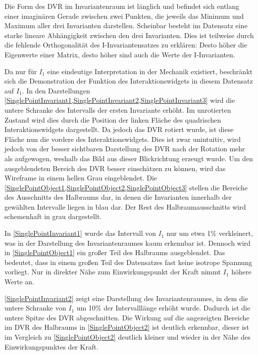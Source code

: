 \documentclass[a4paper,fontsize=12pt,toc=bib,halfparskip,ngerman]{scrartcl}
\begin{document}
Die Form des DVR im Invariantenraum ist l\"anglich und befindet sich entlang einer imagin\"aren Gerade zwischen zwei Punkten, die jeweils das Minimum und Maximum aller drei Invarianten darstellen. Scheinbar besteht im Datensatz eine starke lineare Abh\"angigkeit zwischen den drei Invarianten. Dies ist teilweise durch die fehlende Orthogonalit\"at des I-Invariantensatzes zu erkl\"aren: Desto h\"oher die Eigenwerte einer Matrix, desto h\"oher sind auch die Werte der I-Invarianten.  

Da nur f\"ur $I_1$ eine eindeutige Interpretation in der Mechanik existiert, beschr\"ankt sich die Demonstration der Funktion des Interaktionswidgets in diesem Datensatz auf $I_1$. In den Darstellungen \cref{SinglePointInvariant1,SinglePointInvariant2,SinglePointInvariant3} wird die untere Schranke des Intervalls der ersten Invariante erh\"oht. Im unrotierten Zustand wird dies durch die Position der linken Fl\"ache des quadrischen Interaktionswidgets dargestellt. Da jedoch das DVR rotiert wurde, ist diese Fl\"ache nun die vordere des Interaktionswidgets. Dies ist zwar unintuitiv, wird jedoch von der besser sichtbaren Darstellung des DVR nach der Rotation mehr als aufgewogen, weshalb das Bild aus dieser Blickrichtung erzeugt wurde. Um den ausgeblendeten Bereich des DVR besser einsch\"atzen zu k\"onnen, wird das Wireframe in einem hellen Grau eingeblendet. Die \cref{SinglePointObject1,SinglePointObject2,SinglePointObject3} stellen die Bereiche des Ausschnitts des Halbraums dar, in denen die Invarianten innerhalb der gew\"ahlten Intervalle liegen in blau dar. Der Rest des Halbraumausschnitts wird schemenhaft in grau dargestellt.

In \cref{SinglePointInvariant1} wurde das Intervall von $I_1$ nur um etwa 1\% verkleinert, was in der Darstellung des Invariantenraumes kaum erkennbar ist. Dennoch wird in \cref{SinglePointObject1} ein gro{\ss}er Teil des Halbraums ausgeblendet. Das bedeutet, dass in einem gro{\ss}en Teil des Datensatzes fast keine isotrope Spannung vorliegt. Nur in direkter N\"ahe zum Einwirkungspunkt der Kraft nimmt $I_1$ h\"ohere Werte an. 

\cref{SinglePointInvariant2} zeigt eine Darstellung des Invariantenraumes, in dem die untere Schranke von $I_1$ um 10\% der Intervalll\"ange erh\"oht wurde. Dadurch ist die untere Spitze des DVR abgeschnitten. Die Wirkung auf die angezeigten Bereiche im DVR des Halbraums in \cref{SinglePointObject2} ist deutlich erkennbar, dieser ist im Vergleich zu \cref{SinglePointObject2} deutlich kleiner und wieder in der N\"ahe des Einwirkungspunktes der Kraft. 
\end{document}
